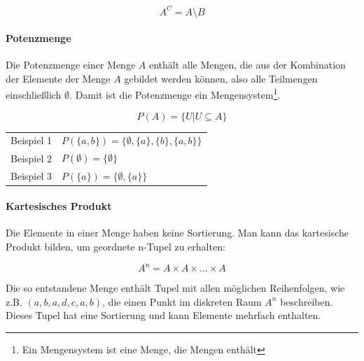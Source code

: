 \documentclass[../main.tex]{subfiles}
\begin{document}
                    \begin{equation}
                        A^C = A \setminus B
                    \end{equation}
                    
                \paragraph{Potenzmenge}
                    Die Potenzmenge einer Menge $A$ enthält alle Mengen, die aus der Kombination der Elemente der Menge $A$ gebildet werden können, also alle Teilmengen einschließlich $\emptyset$. Damit ist die Potenzmenge ein Mengensystem\footnote{Ein Mengensystem ist eine Menge, die Mengen enthält}.
                    
                    \begin{equation}
                        P(A) = \{U | U \subseteq A\}
                    \end{equation}
                    
                    \begin{tabular}{ r l }
                    	Beispiel 1 & $P\left(\{a, b\}\right) = \{\emptyset, \{a\}, \{b\}, \{a, b\}\}$\\
                    	Beispiel 2 & $P\left(\emptyset\right) = \{\emptyset\}$\\
                    	Beispiel 3 & $P\left(\{a\}\right) = \{\emptyset, \{a\}\}$
					\end{tabular}
                    
            	\paragraph{Kartesisches Produkt}
                    Die Elemente in einer Menge haben keine Sortierung. Man kann das kartesische Produkt bilden, um geordnete n-Tupel zu erhalten:
                    
                    \begin{equation}
                        A^n = A \times A \times ... \times A
                    \end{equation}
                    
                    Die so entstandene Menge enthält Tupel mit allen möglichen Reihenfolgen, wie z.B. $\left(a, b, a, d, c, a, b\right)$, die einen Punkt im diskreten Raum $A^n$ beschreiben. Dieses Tupel hat eine Sortierung und kann Elemente mehrfach enthalten.
                    
\end{document}
